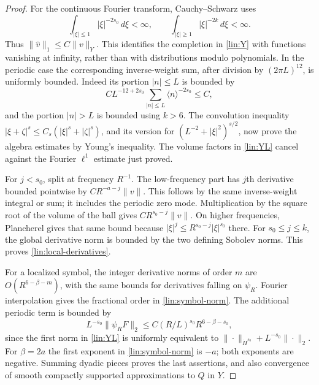 \documentclass[11pt]{article}
\numberwithin{equation}{section}
\theoremstyle{definition}
\theoremstyle{remark}
\begin{document}
\begin{proof}
For the continuous Fourier transform, Cauchy--Schwarz uses
\[
 \int_{|\xi|\le1}|\xi|^{-2s_0}\,d\xi<\infty,
 \qquad
 \int_{|\xi|\ge1}|\xi|^{-2k}\,d\xi<\infty.
\]
Thus $\|\widehat v\|_1\le C\|v\|_Y$.  This identifies the completion in
\eqref{lin:Y} with functions vanishing at infinity, rather than with
distributions modulo polynomials.  In the periodic case the corresponding
inverse-weight sum, after division by $(2\pi L)^{12}$, is uniformly
bounded.  Indeed its portion $|n|\le L$ is bounded by
\[
 C L^{-12+2s_0}\sum_{|n|\le L}\langle n\rangle^{-2s_0}\le C,
\]
and the portion $|n|>L$ is bounded using $k>6$.
The convolution inequality
$|\xi+\zeta|^s\le C_s(|\xi|^s+|\zeta|^s)$, and its version for
$(L^{-2}+|\xi|^2)^{s/2}$, now prove the algebra estimates by Young's
inequality.  The volume factors in \eqref{lin:YL} cancel against the
Fourier $\ell^1$ estimate just proved.

For $j<s_0$, split at frequency $R^{-1}$.  The low-frequency part has
$j$th derivative bounded pointwise by $CR^{-a-j}\|v\|$.  This follows
by the same inverse-weight integral or sum; it includes the periodic
zero mode.  Multiplication by the square root of the volume of the
ball gives $CR^{s_0-j}\|v\|$.  On higher frequencies, Plancherel gives
that same bound because
$|\xi|^j\le R^{s_0-j}|\xi|^{s_0}$ there.  For $s_0\le j\le k$,
the global derivative norm is bounded by the two defining Sobolev
norms.  This proves \eqref{lin:local-derivatives}.

For a localized symbol, the integer derivative norms of order $m$ are
$O(R^{6-\beta-m})$, with the same bounds for derivatives falling on
$\psi_R$.  Fourier interpolation gives the fractional order in
\eqref{lin:symbol-norm}.  The additional periodic term is bounded by
\[
 L^{-s_0}\|\psi_RF\|_2
 \le C(R/L)^{s_0}R^{6-\beta-s_0},
\]
since the first norm in \eqref{lin:YL} is uniformly equivalent to
$\|\cdot\|_{\dot H^{s_0}}+L^{-s_0}\|\cdot\|_2$.
For $\beta=2a$ the first exponent in \eqref{lin:symbol-norm} is $-a$;
both exponents are negative.  Summing dyadic pieces proves the last
assertions, and also convergence of smooth compactly supported
approximations to $Q$ in $Y$.
\end{proof}
\end{document}
